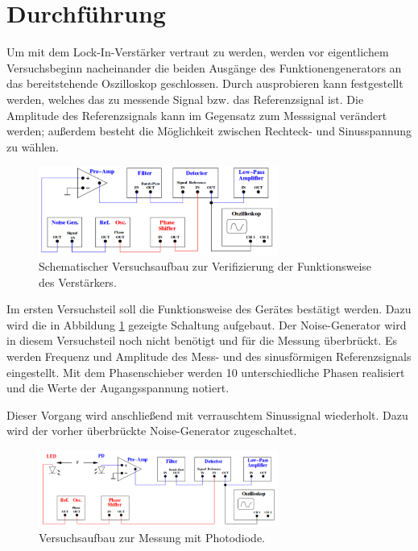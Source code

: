 \section{Durchführung}
\label{sec:Durchfuehrung}
Um mit dem Lock-In-Verstärker vertraut zu werden, werden vor eigentlichem Versuchsbeginn nacheinander die beiden Ausgänge des Funktionengenerators an das bereitstehende Oszilloskop geschlossen. Durch ausprobieren kann festgestellt werden, welches das zu messende Signal bzw. das Referenzsignal ist. Die Amplitude des Referenzsignals kann im Gegensatz zum Messsignal verändert werden; außerdem besteht die Möglichkeit zwischen Rechteck- und Sinusspannung zu wählen.
\begin{figure}
	\centering
		\includegraphics[width=0.7\textwidth]{Bilder/Messung1.pdf}	
\caption{Schematischer Versuchsaufbau zur Verifizierung der Funktionsweise des Verstärkers.}
\label{fig:M1}	
	\end{figure}

Im ersten Versuchsteil soll die Funktionsweise des Gerätes bestätigt werden. Dazu wird die in Abbildung \ref{fig:M1} gezeigte Schaltung aufgebaut. Der Noise-Generator wird in diesem Versuchsteil noch nicht benötigt und für die Messung überbrückt. Es werden Frequenz und Amplitude des Mess- und des sinusförmigen Referenzsignals eingestellt. Mit dem Phasenschieber werden 10 unterschiedliche Phasen realisiert und die Werte der Augangsspannung notiert.

Dieser Vorgang wird anschließend mit verrauschtem Sinussignal wiederholt. Dazu wird der vorher überbrückte Noise-Generator zugeschaltet.

\begin{figure}
	\centering
		\includegraphics[width=0.7\textwidth]{Bilder/Messung2.pdf}
		\caption{Versuchsaufbau zur Messung mit Photodiode.}
		\label{fig:M2}
	\end{figure}

